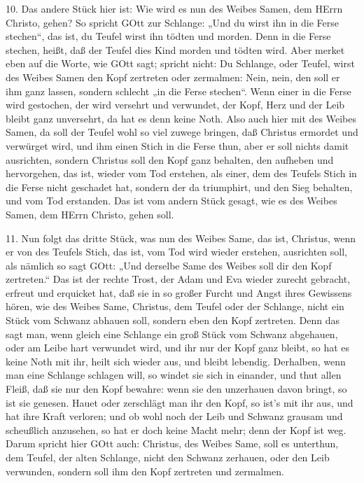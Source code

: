 10. Das andere Stück hier ist: Wie wird es nun des Weibes Samen, dem HErrn Christo, gehen? So spricht GOtt zur Schlange: „Und du wirst ihn in die Ferse stechen“, das ist, du Teufel wirst ihn tödten und morden. Denn in die Ferse stechen, heißt, daß der Teufel dies Kind morden und tödten wird. Aber merket eben auf die Worte, wie GOtt sagt; spricht nicht: Du Schlange, oder Teufel, wirst des Weibes Samen den Kopf zertreten oder zermalmen: Nein, nein, den soll er ihm ganz lassen, sondern schlecht „in die Ferse stechen“. Wenn einer in die Ferse wird gestochen, der wird versehrt und verwundet, der Kopf, Herz und der Leib bleibt ganz unversehrt, da hat es denn keine Noth. Also auch hier mit des Weibes Samen, da soll der Teufel wohl so viel zuwege bringen, daß Christus ermordet und verwürget wird, und ihm einen Stich in die Ferse thun, aber er soll nichts damit ausrichten, sondern Christus soll den Kopf ganz behalten, den aufheben und hervorgehen, das ist, wieder vom Tod erstehen, als einer, dem des Teufels Stich in die Ferse nicht geschadet hat, sondern der da triumphirt, und den Sieg behalten, und vom Tod erstanden. Das ist vom andern Stück gesagt, wie es des Weibes Samen, dem HErrn Christo, gehen soll.

11. Nun folgt das dritte Stück, was nun des Weibes Same, das ist, Christus, wenn er von des Teufels Stich, das ist, vom Tod wird wieder erstehen, ausrichten soll, als nämlich so sagt GOtt: „Und derselbe Same des Weibes soll dir den Kopf zertreten.“ Das ist der rechte Trost, der Adam und Eva wieder zurecht gebracht, erfreut und erquicket hat, daß sie in so großer Furcht und Angst ihres Gewissens hören, wie des Weibes Same, Christus, dem Teufel oder der Schlange, nicht ein Stück vom Schwanz abhauen soll, sondern eben den Kopf zertreten. Denn das sagt man, wenn gleich eine Schlange ein groß Stück vom Schwanz abgehauen, oder am Leibe hart verwundet wird, und ihr nur der Kopf ganz bleibt, so hat es keine Noth mit ihr, heilt sich wieder aus, und bleibt lebendig. Derhalben, wenn man eine Schlange schlagen will, so windet sie sich in einander, und thut allen Fleiß, daß sie nur den Kopf bewahre: wenn sie den unzerhauen davon bringt, so ist sie genesen. Hauet oder zerschlägt man ihr den Kopf, so ist's mit ihr aus, und hat ihre Kraft verloren; und ob wohl noch der Leib und Schwanz grausam und scheußlich anzusehen, so hat er doch keine Macht mehr; denn der Kopf ist weg. Darum spricht hier GOtt auch: Christus, des Weibes Same, soll es unterthun, dem Teufel, der alten Schlange, nicht den Schwanz zerhauen, oder den Leib verwunden, sondern soll ihm den Kopf zertreten und zermalmen.

